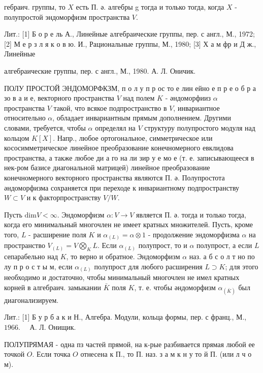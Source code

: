 \documentclass[10pt]{article}
\begin{document}
гебраич. группы, то $X$ есть П. ә. алгебры g тогда и только тогда, когда $X$ - полупростой эндоморфизм пространства $V$.



Лит.: [1] Б о р е ль А., Линейные алгебраические группы, пер. с англ., М., 1972; [2] М е р з л я к о в ю. И., Рациональные группы, М., 1980; [3] Х а м фр и Д ж., Линейные

алгебраические группы, пер. с англ., М., 1980. А. Л. Оничик.



ПОЛУ ПРОСТОЙ ЭНДОМОРФКЗМ, п о л у п р ос то е лин ейно е п р е о б р а зо в а и е, векторного пространства $V$ над полем $K$ - әндоморфииз $\alpha$ пространства $V$ такой, что всякое подпространство в $V$, инвариантное относительно $\alpha$, обладает инвариантным прямым дополнением. Другими словами, требуется, чтобы $\alpha$ определял на $V$ структуру полупростого модуля над кольцом $K[X]$. Напр., любое ортогональное, симметрическое или кососимметрическое линейное преобразование конечномерного евклидова пространства, а также любое ди а го на ли зир у е мо е (т. е. записывающееся в нек-ром базисе диагональной матрицей) линейное преобразование конечномерного векторного пространства являются П. ә. Полупростота әндоморфизма сохраняется при переходе к инвариантному подпространству $W \subset V$ и к факторпространству $V / W$.



Пусть $\mathrm{dim} V<\infty$. Эндоморфизм $\alpha: V \rightarrow V$ является П. ә. тогда и только тогда, когда его минимальный многочлен не имеет кратных множителей. Пусть, кроме того, $L$ - расширение поля $K$ и $\alpha_{(L)}=\alpha \otimes 1$ - продолжение эндоморфизма $\alpha$ на пространство $V_{(L)}=V \bigotimes_{K} L$. Если $\alpha_{(L)}$ полупрост, то и $\alpha$ полупрост, а если $L$ сепарабельно над $K$, то верно и обратное. Эндоморфизм $\alpha$ наз. а б с о л т но по лу п р о с т ы м, если $\alpha_{(L)}$ полупрост для любого расширения $L \supset K$; для этого необходимо и достаточно, чтобы минимальный многочлен не имел кратных корней в алгебраич. замыкании $\bar{K}$ поля $K$, т. е. чтобы әндоморфизм $\alpha_{(\bar{K})}$ был диагонализируем.



Лит.: [1] Б у р б а к и Н., Алгебра. Модули, кольца формы, пер. с франц., М., $1966 . \quad$ А. Л. Онищик.



ПОЛУПРЯМАЯ - одна пз частей прямой, на к-рые разбивается прямая любой ее точкой $O$. Если точка $O$ отнесена к П., то П. наз. з а м к н у то й П. (или л ч о м).
\end{document}
